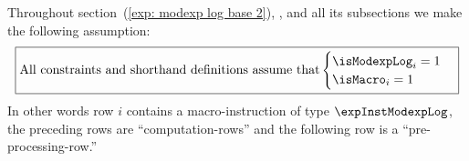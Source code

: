 Throughout section~(\ref{exp: modexp log base 2}), , and all its subsections we make the following assumption:
\[
    \boxed{\text{All constraints and shorthand definitions assume that}
        \begin{cases}
            \isModexpLog _{i} = 1 \\
            \isMacro     _{i} = 1 \\
        \end{cases}}
\]
In other words row $i$ contains a macro-instruction of type $\expInstModexpLog$, the preceding rows are ``computation-rows'' and the following row is a ``pre-processing-row.''
